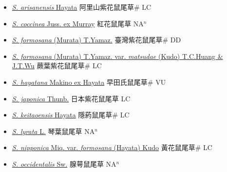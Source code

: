 \begin{itemize}
  \begin{itemize}
        \item[] \href{http://www.theplantlist.org/tpl1.1/search?q=Salvia+arisanensis}{\textit{S. arisanensis} Hayata}   阿里山紫花鼠尾草\# LC
        \item[] \href{http://www.theplantlist.org/tpl1.1/search?q=Salvia+coccinea}{\textit{S. coccinea} Juss. ex Murray}   紅花鼠尾草 NA$^n$
        \item[] \href{http://www.theplantlist.org/tpl1.1/search?q=Salvia+formosana}{\textit{S. formosana} (Murata) T.Yamaz.}   臺灣紫花鼠尾草\# DD
        \item[] \href{http://www.theplantlist.org/tpl1.1/search?q=Salvia+formosana+var.+matsudae}{\textit{S. formosana} (Murata) T.Yamaz. var. \textit{matsudae} (Kudo) T.C.Huang \& J.T.Wu}   蕨葉紫花鼠尾草\# LC
        \item[] \href{http://www.theplantlist.org/tpl1.1/search?q=Salvia+hayatana}{\textit{S. hayatana} Makino ex Hayata}   早田氏鼠尾草\# VU
        \item[] \href{http://www.theplantlist.org/tpl1.1/search?q=Salvia+japonica}{\textit{S. japonica} Thunb.}   日本紫花鼠尾草 LC
        \item[] \href{http://www.theplantlist.org/tpl1.1/search?q=Salvia+keitaoensis}{\textit{S. keitaoensis} Hayata}   隱葯鼠尾草\# LC
        \item[] \href{http://www.theplantlist.org/tpl1.1/search?q=Salvia+lyrata}{\textit{S. lyrata} L.}   琴葉鼠尾草 NA$^n$
        \item[] \href{http://www.theplantlist.org/tpl1.1/search?q=Salvia+nipponica+var.+formosana}{\textit{S. nipponica} Miq. var. \textit{formosana} (Hayata) Kudo}   黃花鼠尾草\# LC
        \item[] \href{http://www.theplantlist.org/tpl1.1/search?q=Salvia+occidentalis}{\textit{S. occidentalis} Sw.}   腺萼鼠尾草 NA$^n$

\end{itemize}
\end{itemize}
